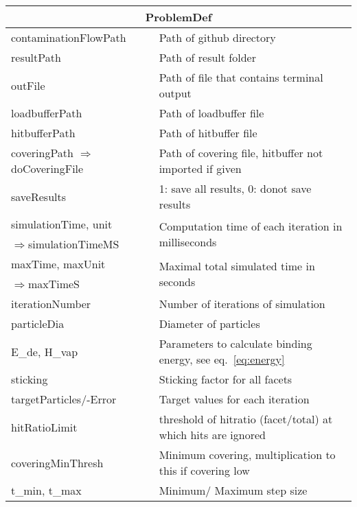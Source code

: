 \begin{center}
\begin{tabular}{|l|l|}
\hline
\multicolumn{2}{|c|}{\rule{0pt}{3ex}ProblemDef}\\
\hline
\rule{0pt}{3ex} contaminationFlowPath& Path of github directory\\
\rule{0pt}{3ex} resultPath& Path of result folder\\
\rule{0pt}{3ex} outFile& Path of file that contains terminal output\\
\rule{0pt}{3ex} loadbufferPath& Path of loadbuffer file\\
\rule{0pt}{3ex} hitbufferPath& Path of hitbuffer file\\
\rule{0pt}{3ex} coveringPath \scriptsize$\Rightarrow$doCoveringFile& Path of covering file, hitbuffer not imported if given\\
\rule{0pt}{3ex} saveResults& 1: save all results, 0: donot save results\\
\rule{0pt}{3ex} simulationTime, unit& \multirow{2}{*}{Computation time of each iteration in milliseconds}\\
\scriptsize\enskip$\Rightarrow$simulationTimeMS&\\
\rule{0pt}{3ex} maxTime, maxUnit& \multirow{2}{*}{Maximal total simulated time in seconds}\\
\scriptsize\enskip$\Rightarrow$maxTimeS&\\
\rule{0pt}{3ex} iterationNumber& Number of iterations of simulation\\
\rule{0pt}{3ex} particleDia& Diameter of particles\\
\rule{0pt}{3ex}  E\_de, H\_vap& Parameters to calculate binding energy, see eq.\ \ref{eq:energy}\\ %
\rule{0pt}{3ex}  sticking&  Sticking factor for all facets\\
\rule{0pt}{3ex}  targetParticles/-Error&  Target values for each iteration\\
\rule{0pt}{3ex}  hitRatioLimit&  threshold of hitratio (facet/total) at which hits are ignored\\
\rule{0pt}{3ex}  coveringMinThresh&  Minimum covering, multiplication to this if covering low\\
\rule{0pt}{3ex}  t\_min, t\_max&  Minimum/ Maximum step size\\

\end{tabular}
\end{center}
